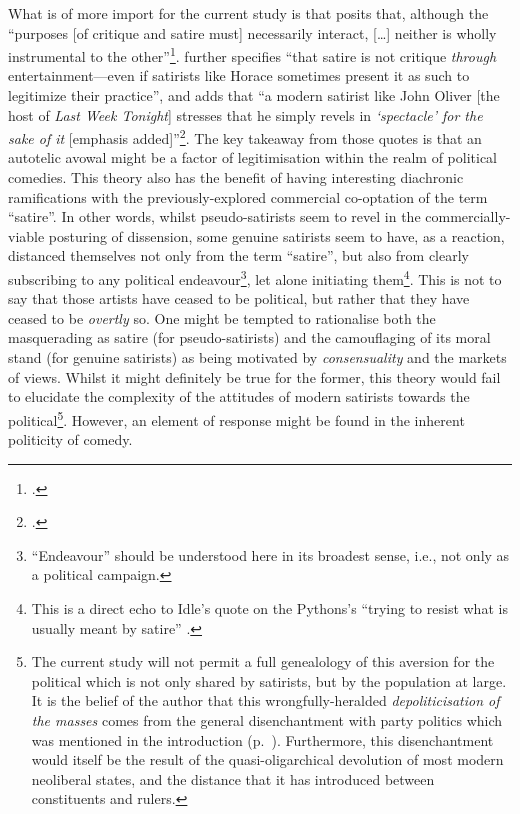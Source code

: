 \documentclass[
,a4paper
,DIV=12
,12pt
,abstract
,bibliography=totoc
]{scrartcl}
\begin{document}
What is of more import for the current study is that \textcite[322--323]{declercq2018} posits that, although the \enquote{purposes [of critique and satire must] necessarily interact, […] neither is wholly instrumental to the other}\footnote{\Cite[323]{declercq2018}.}.  \textcite[325]{declercq2018} further specifies \enquote{that satire is not critique \emph{through} entertainment---even if satirists like Horace sometimes present it as such to legitimize their practice}, and adds that \enquote{a modern satirist like John Oliver [the host of \emph{Last Week Tonight}] stresses that he simply revels in \emph{\enquote{spectacle} for the sake of it} [emphasis added]}\footnote{\Cite{declercq2018,marchese2016}.}.   The key takeaway from those quotes is that an autotelic avowal might be a factor of legitimisation within the realm of political comedies.  This theory also has the benefit of having interesting diachronic ramifications with the previously-explored commercial co-optation of the term \enquote{satire}.  In other words, whilst pseudo-satirists seem to revel in the commercially-viable posturing of dissension, some genuine satirists seem to have, as a reaction, distanced themselves not only from the term \enquote{satire}, but also from clearly subscribing to any political endeavour\footnote{\enquote{Endeavour} should be understood here in its broadest sense, i.e., not only as a political campaign.}, let alone initiating them\footnote{This is a direct echo to Idle’s quote on the Pythons’s \enquote{trying to resist what is usually meant by satire} \parencite[quote fully-reproduced on p.~\pageref{quote-idle-autotelic}]{geng1990}.}.  This is not to say that those artists have ceased to be political, but rather that they have ceased to be \emph{overtly} so.  One might be tempted to rationalise both the masquerading as satire (for pseudo-satirists) and the camouflaging of its moral stand (for genuine satirists) as being motivated by \emph{consensuality} and the markets of views.  Whilst it might definitely be true for the former, this theory would fail to elucidate the complexity of the attitudes of modern satirists towards the political\footnote{The current study will not permit a full genealology of this aversion for the political which is not only shared by satirists, but by the population at large.  It is the belief of the author that this wrongfully-heralded \emph{depoliticisation of the masses} comes from the general disenchantment with party politics which was mentioned in the introduction (p.~\pageref{disenchantment}).  Furthermore, this disenchantment would itself be the result of the quasi-oligarchical devolution of most modern neoliberal states, and the distance that it has introduced between constituents and rulers.}.  However, an element of response might be found in the inherent politicity of comedy.
\end{document}
